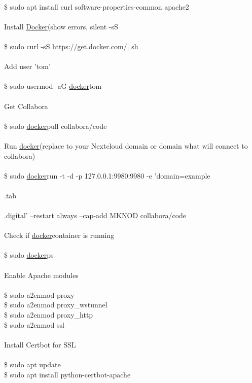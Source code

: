 \documentclass[10pt,a4paper]{article}
\begin{document}
\\
	\$ {\large sudo apt install curl software-properties-common apache2\\
\\
Install \hyperlink{docker}{Docker}}{\large   (show errors, silent -sS\\
\\
	\$ sudo curl -sS https://get.docker.com/}{\large  | sh\\
\\
Add user 'tom'\\
\\
	\$ sudo usermod -aG \hyperlink{docker}{docker}}{\large  tom\\
\\
Get Collabora\\
\\
	\$ sudo \hyperlink{docker}{docker}}{\large  pull collabora/code\\
\\
Run \hyperlink{docker}{docker}}{\large  (replace to your Nextcloud domain or domain what will connect to collabora)\\
\\
	\$ sudo \hyperlink{docker}{docker}}{\large  run -t -d -p 127.0.0.1:9980:9980 -e 'domain=example\\\\.tab\\\\.digital' --restart always --cap-add MKNOD collabora/code\\
\\
Check if \hyperlink{docker}{docker}}{\large  container is running\\
\\
	\$ sudo \hyperlink{docker}{docker}}{\large  ps\\
\\
Enable Apache modules\\
\\
	\$ sudo a2enmod proxy\\
	\$ sudo a2enmod proxy\_wstunnel\\
	\$ sudo a2enmod proxy\_http\\
	\$ sudo a2enmod ssl\\
\\
Install Certbot for SSL\\
\\
	\$ sudo apt update\\
	\$ sudo apt install python-certbot-apache\\
\\
}
\end{document}
